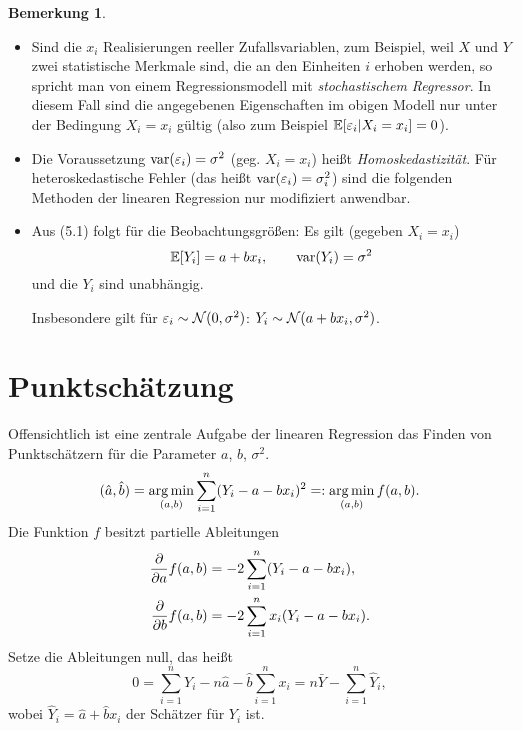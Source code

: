 \documentclass[
 a4paper,
 12pt,
 parskip=half
 ]{scrreprt}
\theoremstyle{plain}
\theoremstyle{definition}
\newtheorem{rmrk}[thm]{Bemerkung}
\numberwithin{equation}{chapter}
\begin{document}
\begin{rmrk}
  \begin{itemize}
  \item Sind die $x_i$ Realisierungen reeller Zufallsvariablen, zum Beispiel,
    weil $X$ und $Y$ zwei statistische Merkmale sind, die an den Einheiten $i$
    erhoben werden, so spricht man von einem Regressionsmodell mit
    \emph{stochastischem Regressor}. In diesem Fall sind die angegebenen
    Eigenschaften im obigen Modell nur unter der Bedingung $X_i = x_i$ gültig
    (also zum Beispiel $\mathbb{E}[\varepsilon_i | X_i = x_i] = 0$).
  \item Die Voraussetzung $\operatorname{var}(\varepsilon_i) = \sigma^2$ (geg. $X_i = x_i$) heißt
    \emph{Homoskedastizität}. Für heteroskedastische Fehler (das heißt $\operatorname{var}
    (\varepsilon_i)=\sigma_i^2$) sind die folgenden Methoden der linearen Regression
    nur modifiziert anwendbar.
  \item Aus (5.1) folgt für die Beobachtungsgrößen: Es gilt (gegeben $X_i =
    x_i$)
    \[ \mathbb{E}[Y_i] = a + b x_i, \qquad \operatorname{var}(Y_i) = \sigma^2 \]
    und die $Y_i$ sind unabhängig.

    Insbesondere gilt für $\varepsilon_i \sim \mathcal{N}(0,\sigma^2)$: $Y_i \sim \mathcal{N}( a
    + b x_i, \sigma^2)$.
  \end{itemize}
\end{rmrk}

\section{Punktschätzung}
Offensichtlich ist eine zentrale Aufgabe der linearen Regression das Finden von
Punktschätzern für die Parameter $a$, $b$, $\sigma^2$.
\[ (\hat{a}, \hat{b}) = \operatorname*{arg\,min}_{(a,b)} \sum_{i=1}^n (Y_i - a - b x_i )^2 =:
  \operatorname*{arg\,min}_{(a,b)} f(a,b). \]
Die Funktion $f$ besitzt partielle Ableitungen
\begin{align*}
  \frac{\partial }{\partial a} f(a,b) &= - 2 \sum_{i=1}^n (Y_i - a - b x_i), \\
  \frac{\partial }{\partial b} f(a,b) &= - 2 \sum_{i=1}^n  x_i (Y_i - a - b x_i). \\
\end{align*}
Setze die Ableitungen null, das heißt
\begin{equation}
 0 = \sum_{i=1}^n Y_i - n \hat{a} - \hat{b} \sum_{i=1}^n x_i = n \bar{Y} -
 \sum_{i=1}^n \hat{Y}_i,
\end{equation}
wobei $\hat{Y}_i = \hat{a} + \hat{b} x_i$ der Schätzer für $Y_i$ ist.
\end{document}
